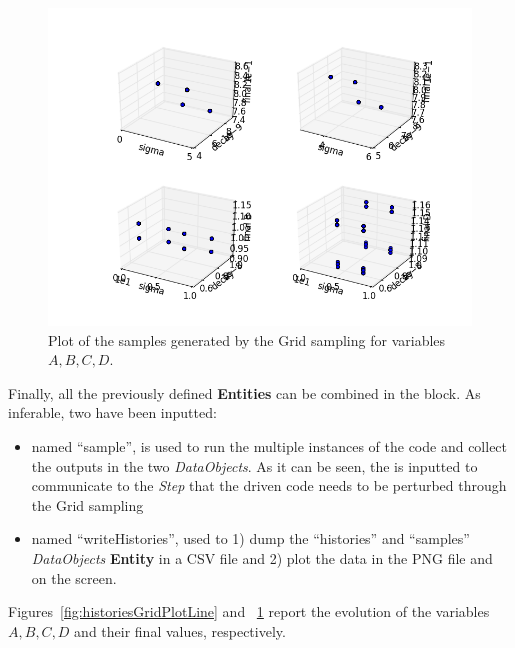 \begin{enumerate}
\begin{lstlisting}[style=XML,morekeywords={arg,extension,pauseAtEnd,overwrite}]
\end{lstlisting}
 \begin{figure}[h!]
  \centering
  \includegraphics[scale=0.7]{pics/Grid_pointsets.png}
  \caption{Plot of the samples generated by the Grid sampling for variables $A,B,C,D$.}
  \label{fig:samplesGridPlotLine}
 \end{figure}
   Finally, all the previously defined \textbf{Entities} can be combined in 
   the  block. As inferable, 
   two  have been inputted:
   \begin{itemize}
     \item {} named ``sample'', is used to run the multiple  
     instances of the code and 
     collect the outputs in the two \textit{DataObjects}. As it can be
     seen, the  is inputted to communicate to the 
     \textit{Step} that the driven code needs to
     be perturbed through the Grid sampling
     \item  {} named ``writeHistories'', used to 1) dump 
     the ``histories'' and ``samples'' \textit{DataObjects} 
     \textbf{Entity} in a CSV file and 2) plot the data in the PNG file and 
     on the screen.
   \end{itemize}
\end{enumerate} 
 Figures~\ref{fig:historiesGridPlotLine} and ~\ref{fig:samplesGridPlotLine}  report the evolution of the 
 variables $A,B,C,D$ and their final values, respectively.


